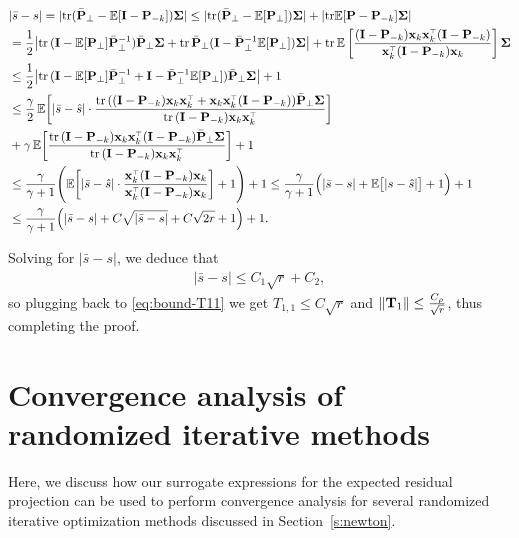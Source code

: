 \documentclass{article}
\begin{document}
\begin{align*}
  &|\bar s - s|  = |\tr (\bar \P_\perp - \E[\I - \P_{-k}] )\Sigmab|   \le |\tr (\bar \P_\perp - \E[\P_\perp] )\Sigmab|   + |\tr \E[\P - \P_{-k}] \Sigmab| \\
  &= \frac12 \big|\tr\,(\I-\E[\P_\perp]\bar\P_\perp^{-1})\bar\P_\perp\Sigmab + \tr\,\bar\P_\perp (\I - \bar \P_\perp^{-1} \E[\P_\perp]) \Sigmab \big|   + \tr\,\E \left[ \frac{(\I - \P_{-k})\x_k\x_k^\top(\I - \P_{-k})}{\x_k^\top (\I - \P_{-k}) \x_k} \right] \Sigmab \\
  &\leq \frac12 \big|\tr\,(\I-\E[\P_\perp]\bar\P_\perp^{-1} + \I - \bar \P_\perp^{-1} \E[\P_\perp])\bar\P_\perp\Sigmab \big|   + 1 \\
  &\leq \frac{\gamma}2 \,\E\bigg[|\bar s-\hat s|\cdot
    \frac{\tr\,( (\I -\P_{-k})\x_k\x_k^\top + \x_k\x_k^\top (\I -\P_{-k})) \bar\P_\perp\Sigmab}{\tr\,(\I -\P_{-k})\x_k\x_k^\top}  \bigg] \\
  &+ \gamma\, \E\bigg[\frac{\tr\,(\I-\P_{-k})\x_k\x_k^\top(\I-\P_{-k})\bar\P_\perp\Sigmab}
    {\tr\,(\I-\P_{-k})\x_k\x_k^\top}\bigg] + 1\\
  &\leq \frac{\gamma}{\gamma+1}\Bigg(\E\bigg[|\bar s-\hat
    s| \cdot \frac{\x_k^\top (\I -\P_{-k}) \x_k}{\x_k^\top (\I -\P_{-k}) \x_k}  \bigg] + 1\Bigg) + 1\leq \frac{\gamma}{\gamma+1}\Big(|\bar
    s-s| + \E\big[|s-\hat s|\big] + 1\Big) + 1 \\
  &\leq \frac{\gamma}{\gamma+1}\Big(|\bar s- s| +
     C\sqrt{|\bar s- s|} + C\sqrt{2 r} + 1\Big) + 1.
\end{align*}

Solving for $|\bar s-s|$, we deduce that
\begin{align*}
  |\bar s-s| \leq C_1 \sqrt{r} + C_2,
\end{align*}
so plugging back to \eqref{eq:bound-T11} we get $T_{1,1} \le C
\sqrt r$ and $\| \mathbf{T}_1\| \le \frac{C_\rho}{\sqrt r} $, thus completing
the proof.
\section{Convergence analysis of randomized iterative methods}
\label{a:newton}

Here, we discuss how our surrogate expressions for the expected
residual projection can be used to perform convergence analysis for
several randomized iterative optimization methods discussed in
Section~\ref{s:newton}.
\end{document}
